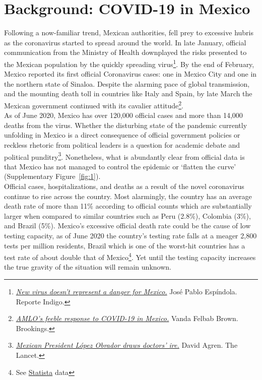 \documentclass[hidelinks,10pt]{article}
\begin{document}
		
	
	
	\section{Background: COVID-19 in Mexico}\label{sec_context}
	
	Following a now-familiar trend, Mexican authorities, fell prey to excessive hubris as the coronavirus started to spread around the world. 
	In late January, official communication from the Ministry of Health downplayed the risks presented to the Mexican population by the quickly spreading virus\footnote{\href{https://www.reporteindigo.com/piensa/el-nuevo-virus-coronavirus-no-representa-un-peligro-para-mexico/}{\textit{New virus doesn't represent a danger for Mexico.}} José Pablo Espíndola. Reporte Indigo.}. By the end of February, Mexico reported its first official Coronavirus cases: one in Mexico City and one in the northern state of Sinaloa. Despite the alarming pace of global transmission, and the mounting death toll in countries like Italy and Spain, by late March the Mexican government continued with its cavalier attitude\footnote{\href{https://www.brookings.edu/blog/order-from-chaos/2020/03/30/amlos-feeble-response-to-covid-19-in-mexico/}{\textit{AMLO’s feeble response to COVID-19 in Mexico.}} Vanda Felbab Brown. Brookings.}. \\
	As of June 2020, Mexico has over 120,000 official cases and more than 14,000 deaths from the virus. Whether the disturbing state of the pandemic currently unfolding in Mexico is a direct consequence of official government policies or reckless rhetoric from political leaders is a question for academic debate and political punditry\footnote{\href{https://www.thelancet.com/journals/lancet/article/PIIS0140-6736(20)31198-3/fulltext}{\textit{Mexican President López Obrador draws doctors’ ire.}} David Agren. The Lancet.}. Nonetheless, what is abundantly clear from official data is that Mexico has not managed to control the epidemic or ‘flatten the curve’ (Supplementary Figure~\ref{fig:1}).\\
	Official cases, hospitalizations, and deaths as a result of the novel coronavirus continue to rise across the country. Most alarmingly, the country has an average death rate of more than 11\% according to official counts which are substantially larger when compared to similar countries such as Peru (2.8\%), Colombia (3\%), and Brazil (5\%). Mexico’s excessive official death rate could be the cause of low testing capacity, as of June 2020 the country’s testing rate falls at a meager 2,800 tests per million residents, Brazil which is one of the worst-hit countries has a test rate of about double that of Mexico\footnote{ See \href{https://www.statista.com/statistics/1104645/covid19-testing-rate-select-countries-worldwide/}{Statista} data}. Yet until the testing capacity increases the true gravity of the situation will remain unknown. \\
\end{document}
